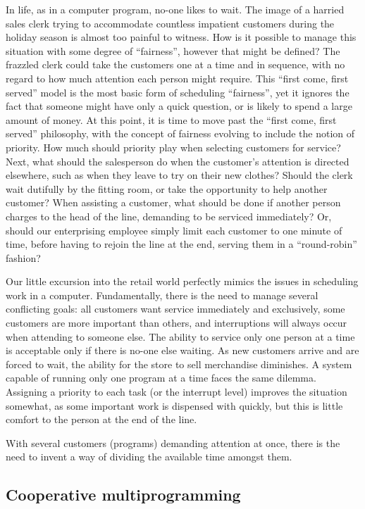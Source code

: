 \documentclass[refcap, oxford]{ahsan}
\begin{document}
In life, as in a computer program, no-one likes to wait. The image of a harried sales clerk trying to accommodate countless impatient customers during the holiday season is almost too painful to witness. How is it possible to manage this situation with some degree of ``fairness'', however that might be defined? The frazzled clerk could take the customers one at a time and in sequence, with no regard to how much attention each person might require. This ``first come, first served'' model is the most basic form of scheduling ``fairness'', yet it ignores the fact that someone might have only a quick question, or is likely to spend a large amount of money. At this point, it is time to move past the ``first come, first served'' philosophy, with the concept of fairness evolving to include the notion of priority. How much should priority play when selecting customers for service? Next, what should the salesperson do when the customer's attention is directed elsewhere, such as when they leave to try on their new clothes? Should the clerk wait dutifully by the fitting room, or take the opportunity to help another customer? When assisting a customer, what should be done if another person charges to the head of the line, demanding to be serviced immediately? Or, should our enterprising employee simply limit each customer to one minute of time, before having to rejoin the line at the end, serving them in a ``round-robin'' fashion?

Our little excursion into the retail world perfectly mimics the issues in scheduling work in a computer. Fundamentally, there is the need to manage several conflicting goals: all customers want service immediately and exclusively, some customers are more important than others, and interruptions will always occur when attending to someone else. The ability to service only one person at a time is acceptable only if there is no-one else waiting. As new customers arrive and are forced to wait, the ability for the store to sell merchandise diminishes. A system capable of running only one program at a time faces the same dilemma. Assigning a priority to each task (or the interrupt level) improves the situation somewhat, as some important work is dispensed with quickly, but this is little comfort to the person at the end of the line.

With several customers (programs) demanding attention at once, there is the need to invent a way of dividing the available time amongst them.


\subsection{Cooperative multiprogramming}
\end{document}

